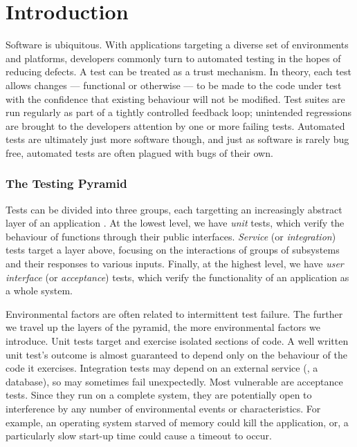 \section{Introduction}
\label{sec:intro}

Software is ubiquitous. With applications targeting a diverse set of environments and platforms, developers commonly turn to automated testing in the hopes of reducing defects. A test can be treated as a trust mechanism. In theory, each test allows changes --- functional or otherwise --- to be made to the code under test with the confidence that existing behaviour will not be modified. Test suites are run regularly as part of a tightly controlled feedback loop; unintended regressions are brought to the developers attention by one or more failing tests. Automated tests are ultimately just more software though, and just as software is rarely bug free, automated tests are often plagued with bugs of their own.

\subsubsection{The Testing Pyramid}
\label{sec:sec:sec:the_testing_pyramid}

Tests can be divided into three groups, each targetting an increasingly abstract layer of an application \citep[see][Chapter~16]{cohn2009succeeding}. At the lowest level, we have \emph{unit} tests, which verify the behaviour of functions through their public interfaces. \emph{Service} (or \emph{integration}) tests target a layer above, focusing on the interactions of groups of subsystems and their responses to various inputs. Finally, at the highest level, we have \emph{user interface} (or \emph{acceptance}) tests, which verify the functionality of an application as a whole system.

Environmental factors are often related to intermittent test failure. The further we travel up the layers of the pyramid, the more environmental factors we introduce. Unit tests target and exercise isolated sections of code. A well written unit test's outcome is almost guaranteed to depend only on the behaviour of the code it exercises. Integration tests may depend on an external service (\eg, a database), so may sometimes fail unexpectedly. Most vulnerable are acceptance tests. Since they run on a complete system, they are potentially open to interference by any number of environmental events or characteristics. For example, an operating system starved of memory could kill the application, or, a particularly slow start-up time could cause a timeout to occur.

